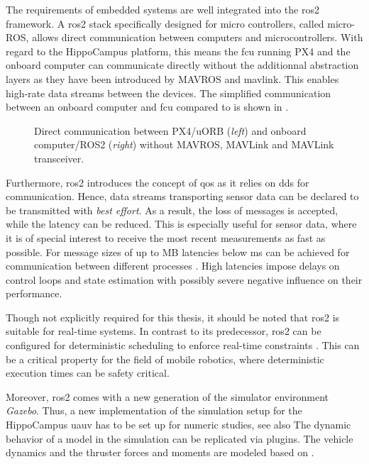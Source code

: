 The requirements of embedded systems are well integrated into the \ac{ros2} framework. A \ac{ros2} stack specifically designed for micro controllers, called micro-ROS, allows direct communication between computers and microcontrollers. 
With regard to the HippoCampus platform, this means the \ac{fcu} running PX4 and the onboard computer can communicate directly without the additionnal abstraction layers as they have been introduced by MAVROS and \ac{mavlink}. This enables high-rate data streams between the devices. The simplified communication between an onboard computer and \ac{fcu} compared to  is shown in .
\begin{figure}
	\centering
	
    \caption{Direct communication between PX4/uORB (\emph{left}) and onboard computer/ROS2 (\emph{right}) without MAVROS, MAVLink and MAVLink transceiver.}
    \label{fig:communication_px4_ros2}
\end{figure}

Furthermore, \ac{ros2} introduces the concept of \ac{qos} as it relies on \ac{dds} for communication. Hence, data streams transporting sensor data can be declared to be transmitted with \emph{best effort}. As a result, the loss of messages is accepted, while the latency can be reduced. This is especially useful for sensor data, where it is of special interest to receive the most recent measurements as fast as possible. 
For message sizes of up to \unit[1]{MB} latencies below \unit[1]{ms} can be achieved for communication between different processes \cite{ros2}. High latencies impose delays on control loops and state estimation with possibly severe negative influence on their performance.

Though not explicitly required for this thesis, it should be noted that \ac{ros2} is suitable for real-time systems. In contrast to its predecessor, \ac{ros2} can be configured for deterministic scheduling to enforce real-time constraints \cite{ros-realtime20}. This can be a critical property for the field of mobile robotics, where deterministic execution times can be safety critical.

Moreover, \ac{ros2} comes with a new generation of the simulator environment \textit{Gazebo}.
Thus, a new implementation of the simulation setup for the HippoCampus \ac{uauv} has to be set up for numeric studies, see also 
The dynamic behavior of a model in the simulation can be replicated via plugins.
The vehicle dynamics and the thruster forces and moments are modeled based on  .


